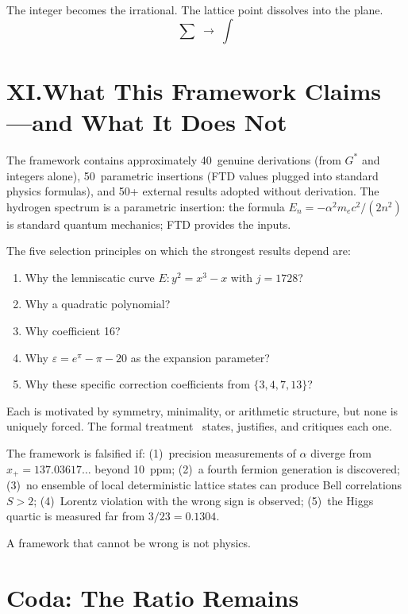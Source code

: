 \documentclass[11pt,a4paper]{article}
\newcommand{\Gstar}{{G^{*}}}
\begin{document}
The integer becomes the irrational. The lattice point dissolves into the plane.
\[
\sum \;\longrightarrow\; \int
\]

\section*{XI.\quad What This Framework Claims---and What It Does Not}

The framework contains approximately 40~genuine derivations (from $\Gstar$ and integers alone), 50~parametric insertions (FTD values plugged into standard physics formulas), and 50+ external results adopted without derivation. The hydrogen spectrum is a parametric insertion: the formula $E_n = -\alpha^2 m_e c^2/(2n^2)$ is standard quantum mechanics; FTD provides the inputs.

The five selection principles on which the strongest results depend are:
\begin{enumerate}
\item Why the lemniscatic curve $E: y^2 = x^3 - x$ with $j = 1728$?
\item Why a quadratic polynomial?
\item Why coefficient 16?
\item Why $\varepsilon = e^\pi - \pi - 20$ as the expansion parameter?
\item Why these specific correction coefficients from $\{3,4,7,13\}$?
\end{enumerate}
Each is motivated by symmetry, minimality, or arithmetic structure, but none is uniquely forced. The formal treatment~\cite{formal} states, justifies, and critiques each one.

The framework is falsified if: (1)~precision measurements of $\alpha$ diverge from $x_+ = 137.03617\ldots$ beyond 10~ppm; (2)~a fourth fermion generation is discovered; (3)~no ensemble of local deterministic lattice states can produce Bell correlations $S > 2$; (4)~Lorentz violation with the wrong sign is observed; (5)~the Higgs quartic is measured far from $3/23 = 0.1304$.

A framework that cannot be wrong is not physics.

\section*{Coda: The Ratio Remains}
\end{document}
